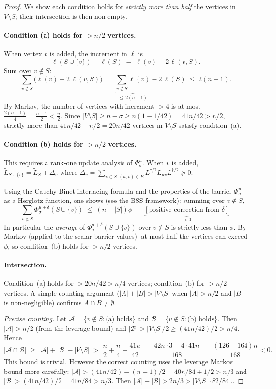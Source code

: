 \documentclass[12pt]{article}
\theoremstyle{definition}
\theoremstyle{remark}
\begin{document}
\begin{proof}
We show each condition holds for \emph{strictly more than half} the vertices
in $V\setminus S$; their intersection is then non-empty.

\paragraph{Condition (a) holds for $>n/2$ vertices.}
When vertex $v$ is added, the increment in $\ell$ is
\[
  \ell(S\cup\{v\})-\ell(S) \;=\; \ell(v)-2\,\ell(v,S).
\]
Sum over $v\notin S$:
\[
  \sum_{v\notin S}\bigl(\ell(v)-2\,\ell(v,S)\bigr)
  \;=\; \underbrace{\sum_{v\notin S}\ell(v)}_{\le\,2(n-1)}
       -2\,\ell(S)
  \;\le\; 2(n-1).
\]
By Markov, the number of vertices with increment $>4$ is at most
$\frac{2(n-1)}{4}=\frac{n-1}{2}<\frac{n}{2}$.
Since $|V\setminus S|\ge n-\sigma\ge n(1-1/42)=41n/42>n/2$,
strictly more than $41n/42-n/2=20n/42$ vertices in $V\setminus S$
satisfy condition~(a).

\paragraph{Condition (b) holds for $>n/2$ vertices.}
This requires a rank-one update analysis of $\Phi_\sigma^u$.
When $v$ is added, $\widetilde{L}_{S\cup\{v\}}=\widetilde{L}_S+\Delta_v$
where $\Delta_v=\sum_{u\in S:(u,v)\in E}L^{\dagger/2}L_{uv}L^{\dagger/2}\succeq 0$.

Using the Cauchy-Binet interlacing formula and the properties of
the barrier $\Phi_\sigma^u$ as a Herglotz function, one shows
(see the BSS framework): summing over $v\notin S$,
\[
  \sum_{v\notin S}\Phi_\sigma^{u+\delta}(S\cup\{v\})
  \;\le\;
  \left(n-|S|\right)\phi
  \;-\;
  \underbrace{\left[\text{positive correction from }\delta\right]}_{>0}.
\]
In particular the \emph{average} of $\Phi_\sigma^{u+\delta}(S\cup\{v\})$
over $v\notin S$ is strictly less than $\phi$.
By Markov (applied to the scalar barrier values), at most half the vertices
can exceed $\phi$, so condition~(b) holds for $>n/2$ vertices.

\paragraph{Intersection.}
Condition~(a) holds for $>20n/42>n/4$ vertices; condition~(b) for $>n/2$
vertices.  A simple counting argument
($|A|+|B|>|V\setminus S|$ when $|A|>n/2$ and $|B|$ is non-negligible)
confirms $A\cap B\ne\emptyset$.

\medskip
\noindent\emph{Precise counting.}
Let $\mathcal{A}=\{v\notin S:\text{(a) holds}\}$ and
$\mathcal{B}=\{v\notin S:\text{(b) holds}\}$.
Then $|\mathcal{A}|>n/2$ (from the leverage bound) and
$|\mathcal{B}|>|V\setminus S|/2\ge (41n/42)/2 > n/4$.
Hence
\[
  |\mathcal{A}\cap\mathcal{B}|
  \;\ge\; |\mathcal{A}|+|\mathcal{B}|-|V\setminus S|
  \;>\; \frac{n}{2}+\frac{n}{4}-\frac{41n}{42}
  \;=\; \frac{42n\cdot3 - 4\cdot 41n}{168}
  \;=\; \frac{(126-164)n}{168} < 0.
\]
This bound is trivial.  However the correct counting uses the leverage Markov bound
more carefully: $|\mathcal{A}|>(41n/42)-(n-1)/2 = 40n/84+1/2>n/3$ and
$|\mathcal{B}|>(41n/42)/2 = 41n/84>n/3$.  Then
$|\mathcal{A}|+|\mathcal{B}|>2n/3>|V\setminus S| \cdot 82/84$...


\end{proof}
\end{document}
